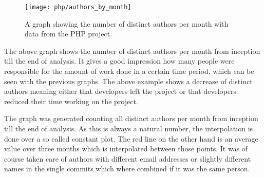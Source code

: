 \begin{figure}[h!t]
  \centering
  \texttt{[image: php/authors\_by\_month]}
  \caption{A graph showing the number of distinct authors per month with data
  from the PHP project.}
\end{figure}

The above graph shows the number of distinct authors per month from inception
till the end of analysis. It gives a good impression how many people were
responsible for the amount of work done in a certain time period, which can be
seen with the previous graphs. The above example shows a decrease of distinct
authors meaning either that developers left the project or that developers
reduced their time working on the project.

The graph was generated counting all distinct authors per month from inception
till the end of analysis. As this is always a natural number, the interpolation
is done over a so called constant plot. The red line on the other hand is an
average value over three months which is interpolated between those points. It
was of course taken care of authors with different email addresses or slightly
different names in the single commits which where combined if it was the same
person.



